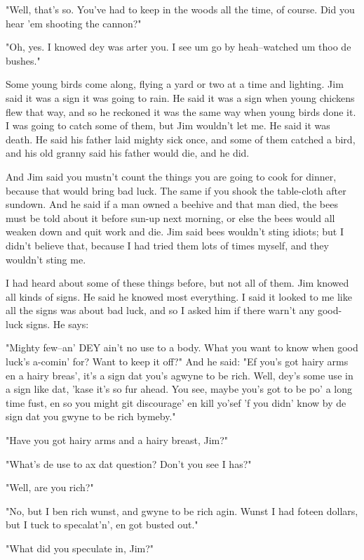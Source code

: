 "Well, that's so.  You've had to keep in the woods all the time, of
course. Did you hear 'em shooting the cannon?"

"Oh, yes.  I knowed dey was arter you.  I see um go by heah--watched um
thoo de bushes."

Some young birds come along, flying a yard or two at a time and lighting.
Jim said it was a sign it was going to rain.  He said it was a sign when
young chickens flew that way, and so he reckoned it was the same way when
young birds done it.  I was going to catch some of them, but Jim wouldn't
let me.  He said it was death.  He said his father laid mighty sick once,
and some of them catched a bird, and his old granny said his father would
die, and he did.

And Jim said you mustn't count the things you are going to cook for
dinner, because that would bring bad luck.  The same if you shook the
table-cloth after sundown.  And he said if a man owned a beehive and that
man died, the bees must be told about it before sun-up next morning, or
else the bees would all weaken down and quit work and die.  Jim said bees
wouldn't sting idiots; but I didn't believe that, because I had tried
them lots of times myself, and they wouldn't sting me.

I had heard about some of these things before, but not all of them.  Jim
knowed all kinds of signs.  He said he knowed most everything.  I said it
looked to me like all the signs was about bad luck, and so I asked him if
there warn't any good-luck signs.  He says:

"Mighty few--an' DEY ain't no use to a body.  What you want to know when
good luck's a-comin' for?  Want to keep it off?"  And he said:  "Ef you's
got hairy arms en a hairy breas', it's a sign dat you's agwyne to be
rich. Well, dey's some use in a sign like dat, 'kase it's so fur ahead.
You see, maybe you's got to be po' a long time fust, en so you might git
discourage' en kill yo'sef 'f you didn' know by de sign dat you gwyne to
be rich bymeby."

"Have you got hairy arms and a hairy breast, Jim?"

"What's de use to ax dat question?  Don't you see I has?"

"Well, are you rich?"

"No, but I ben rich wunst, and gwyne to be rich agin.  Wunst I had foteen
dollars, but I tuck to specalat'n', en got busted out."

"What did you speculate in, Jim?"

